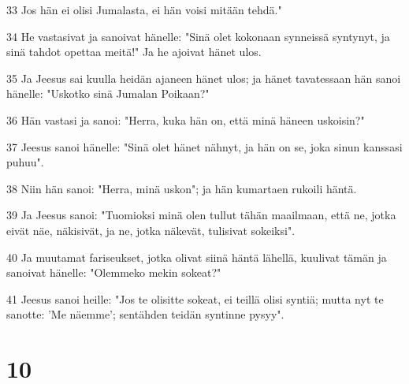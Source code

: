 \par 33 Jos hän ei olisi Jumalasta, ei hän voisi mitään tehdä."
\par 34 He vastasivat ja sanoivat hänelle: "Sinä olet kokonaan synneissä syntynyt, ja sinä tahdot opettaa meitä!" Ja he ajoivat hänet ulos.
\par 35 Ja Jeesus sai kuulla heidän ajaneen hänet ulos; ja hänet tavatessaan hän sanoi hänelle: "Uskotko sinä Jumalan Poikaan?"
\par 36 Hän vastasi ja sanoi: "Herra, kuka hän on, että minä häneen uskoisin?"
\par 37 Jeesus sanoi hänelle: "Sinä olet hänet nähnyt, ja hän on se, joka sinun kanssasi puhuu".
\par 38 Niin hän sanoi: "Herra, minä uskon"; ja hän kumartaen rukoili häntä.
\par 39 Ja Jeesus sanoi: "Tuomioksi minä olen tullut tähän maailmaan, että ne, jotka eivät näe, näkisivät, ja ne, jotka näkevät, tulisivat sokeiksi".
\par 40 Ja muutamat fariseukset, jotka olivat siinä häntä lähellä, kuulivat tämän ja sanoivat hänelle: "Olemmeko mekin sokeat?"
\par 41 Jeesus sanoi heille: "Jos te olisitte sokeat, ei teillä olisi syntiä; mutta nyt te sanotte: 'Me näemme'; sentähden teidän syntinne pysyy".

\chapter{10}


